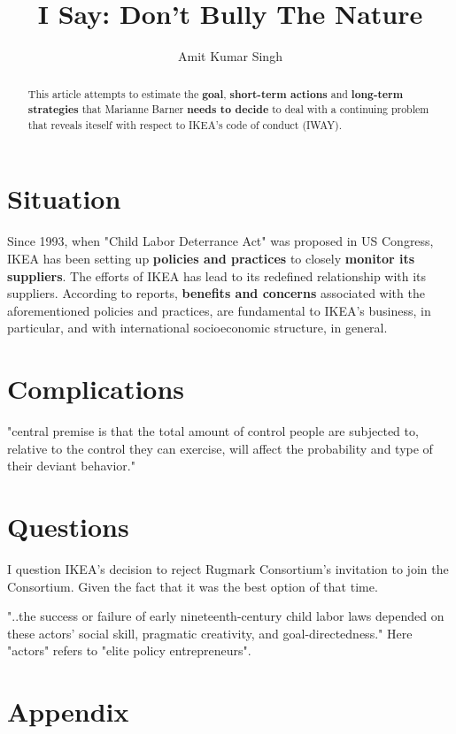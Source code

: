 \documentclass[11pt, a4paper, margin=1in]{IEEEtran}
\begin{document}
\title{I Say: Don't Bully The Nature}
\author{Amit Kumar Singh}
\maketitle

\renewcommand{\abstractname}{Executive Summary}
\begin{abstract}
This article attempts to estimate the \textbf{goal}, \textbf{short-term actions} and \textbf{long-term strategies} that Marianne Barner \textbf{needs to decide} to deal with a continuing problem that reveals iteself with respect to IKEA's code of conduct (IWAY).
\end{abstract}
\section{Situation}
Since 1993, when "Child Labor Deterrance Act" was proposed in US Congress, IKEA has been setting up \textbf{policies and practices} to closely \textbf{monitor its suppliers}. The efforts of IKEA has lead to its redefined relationship with its suppliers. According to reports, \textbf{benefits and concerns} associated with the aforementioned policies and practices, are fundamental to IKEA's business, in particular, and with international socioeconomic structure, in general.
\section{Complications}
"central premise is that the total amount of control people are subjected to, relative to the control they can exercise, will affect the probability and type of their deviant behavior." \cite{tittle2018control}
\section{Questions}
I question IKEA's decision to reject Rugmark Consortium's invitation to join the Consortium. Given the fact that it was the best option of that time. \cite{publichearing1998}

"..the success or failure of early nineteenth-century child labor laws depended on these actors’ social skill, pragmatic creativity, and goal-directedness." \cite{anderson2018policy} Here "actors" refers to "elite policy entrepreneurs".

\newpage

\section{Appendix}
\end{document}
